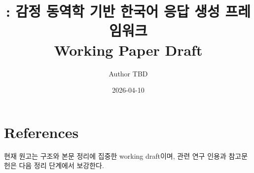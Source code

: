 \documentclass[11pt]{article}
\title{\EmoNet: 감정 동역학 기반 한국어 응답 생성 프레임워크\\\large Working Paper Draft}
\author{Author TBD}
\date{2026-04-10}
\begin{document}
\maketitle









\section*{References}
현재 원고는 구조와 본문 정리에 집중한 working draft이며, 관련 연구 인용과 참고문헌은 다음 정리 단계에서 보강한다.
\end{document}
